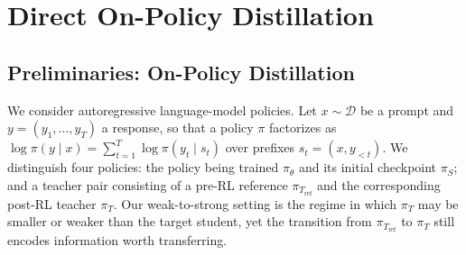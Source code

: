 \section{Direct On-Policy Distillation}
\label{sec:method}



\subsection{Preliminaries: On-Policy Distillation}
\label{sec:preliminaries}

We consider autoregressive language-model policies. Let $x\sim\mathcal{D}$ be a
prompt and $y=(y_1,\ldots,y_T)$ a response, so that a policy $\pi$ factorizes as
$\log\pi(y\mid x)=\sum_{t=1}^{T}\log\pi(y_t\mid s_t)$ over prefixes
$s_t=(x,y_{<t})$. We distinguish four policies: the policy being trained
$\pi_\theta$ and its initial checkpoint $\pi_S$; and a teacher pair consisting of
a pre-RL reference $\pi_{T_{\mathrm{ref}}}$ and the corresponding post-RL teacher
$\pi_T$. Our weak-to-strong setting is the regime in which $\pi_T$ may be smaller or weaker than the target student, yet the transition from $\pi_{T_{\mathrm{ref}}}$ to $\pi_T$ still encodes information worth transferring.

